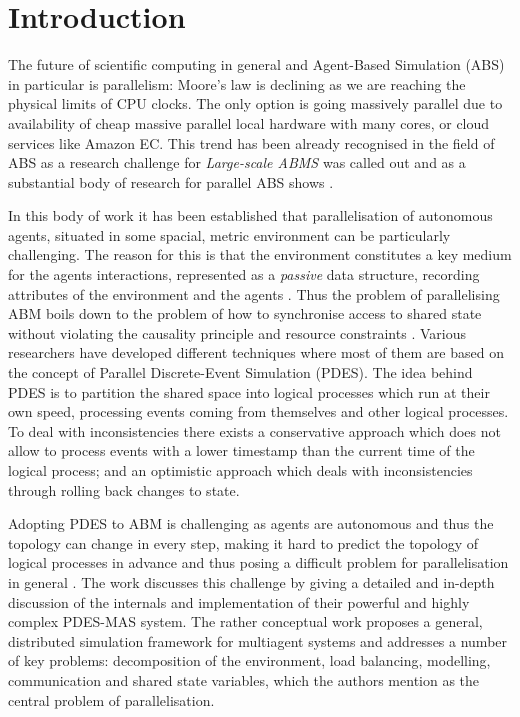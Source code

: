 \section{Introduction} %
The future of scientific computing in general and Agent-Based Simulation (ABS) in particular is parallelism: Moore's law is declining as we are reaching the physical limits of CPU clocks. The only option is going massively parallel due to availability of cheap massive parallel local hardware with many cores, or cloud services like Amazon EC. This trend has been already recognised in the field of ABS as a research challenge for \textit{Large-scale ABMS} \cite{macal_everything_2016} was called out and as a substantial body of research for parallel ABS shows \cite{suryanarayanan_pdes-mas_2013, logan_distributed_2001, lees_using_2008, suryanarayanan_synchronised_2013, riley_next_2003, gasser_mace3j:_2002, himmelspach_plugn_2007, minson_distributing_2008, gorur_repast_2016, hay_experiments_2015, abar_agent_2017, cicirelli_efficient_2015}.

In this body of work it has been established that parallelisation of autonomous agents, situated in some spacial, metric environment can be particularly challenging. The reason for this is that the environment constitutes a key medium for the agents interactions, represented as a \textit{passive} data structure, recording attributes of the environment and the agents \cite{lees_using_2008}. Thus the problem of parallelising ABM boils down to the problem of how to synchronise access to shared state without violating the causality principle and resource constraints \cite{logan_distributed_2001, suryanarayanan_pdes-mas_2013}. Various researchers have developed different techniques where most of them are based on the concept of Parallel Discrete-Event Simulation (PDES). The idea behind PDES is to partition the shared space into logical processes which run at their own speed, processing events coming from themselves and other logical processes. To deal with inconsistencies there exists a conservative approach which does not allow to process events with a lower timestamp than the current time of the logical process; and an optimistic approach which deals with inconsistencies through rolling back changes to state.

Adopting PDES to ABM is challenging as agents are autonomous and thus the topology can change in every step, making it hard to predict the topology of logical processes in advance \cite{lees_using_2008} and thus posing a difficult problem for parallelisation in general \cite{cicirelli_efficient_2015}. The work \cite{suryanarayanan_pdes-mas_2013, suryanarayanan_synchronised_2013} discusses this challenge by giving a detailed and in-depth discussion of the internals and implementation of their powerful and highly complex PDES-MAS system. The rather conceptual work \cite{logan_distributed_2001} proposes a general, distributed simulation framework for multiagent systems and addresses a number of key problems: decomposition of the environment, load balancing, modelling, communication and shared state variables, which the authors mention as the central problem of parallelisation.

